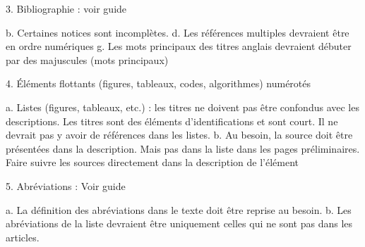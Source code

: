 3. Bibliographie : voir guide

b. Certaines notices sont incomplètes.
d. Les références multiples devraient être en ordre numériques
g. Les mots principaux des titres anglais devraient débuter par des majuscules (mots principaux)

4. Éléments flottants (figures, tableaux, codes, algorithmes) numérotés

a. Listes (figures, tableaux, etc.) : les titres ne doivent pas être confondus avec les descriptions. Les titres sont des éléments d'identifications et sont court. Il ne devrait pas y avoir de références dans les listes.
b. Au besoin, la source doit être présentées dans la description. Mais pas dans la liste dans les pages préliminaires. Faire suivre les sources directement dans la description de l'élément



5. Abréviations : Voir guide

a. La définition des abréviations dans le texte doit être reprise au besoin.
b. Les abréviations de la liste devraient être uniquement celles qui ne sont pas dans les articles.

